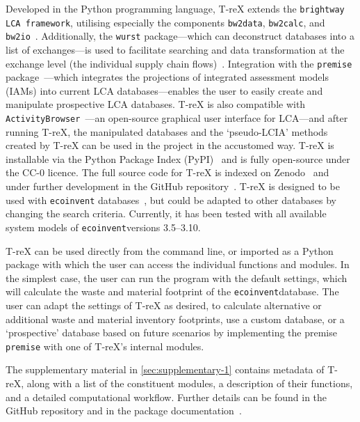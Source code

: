 \documentclass[a4paper,fleqn]{cas-dc}
\begin{document}
	Developed in the Python programming language, T-reX extends the \texttt{brightway LCA framework}, utilising especially the components
	\texttt{bw2data}, \texttt{bw2calc}, and
	\texttt{bw2io}~\citep{mutel2017brightway}. Additionally, the \texttt{wurst}
	package---which can deconstruct databases into a list of exchanges---is used to
	facilitate searching and data transformation at the exchange level (the
	individual supply chain flows)~\citep{mutel2017wurst}. Integration with the
	\texttt{premise} package~\citep{sacchi2022premise}---which integrates the
	projections of integrated assessment models (IAMs) into current LCA
	databases---enables the user to easily create and manipulate prospective LCA
	databases. T-reX is also compatible with
	\texttt{ActivityBrowser}~\citep{steubing2020activitybrowser}---an open-source
	graphical user interface for LCA---and after running T-reX, the manipulated
	databases and the `pseudo-LCIA' methods created by T-reX can be used in the
	project in the accustomed way. T-reX is installable via the Python Package
	Index (PyPI)~\citep{mcdowall2023T-reXpipy} and is fully open-source under the
	CC-0 licence. The full source code for T-reX is indexed on
	Zenodo~\citep{mcdowall2023T-reXzenodo} and under further development in the
	GitHub repository~\citep{mcdowall2024T-reXgithub}. T-reX is designed to be used
	with \texttt{ecoinvent} databases~\citep{ecoinvent2016version3}, but could be
	adapted to other databases by changing the search criteria. Currently, it has
	been tested with all available system models of \texttt{ecoinvent}versions
	3.5--3.10.
	
	T-reX can be used directly from the command line, or imported as a Python
	package with which the user can access the individual functions and modules. In
	the simplest case, the user can run the program with the default settings,
	which will calculate the waste and material footprint of the
	\texttt{ecoinvent}database. The user can adapt the settings of T-reX as
	desired, to calculate alternative or additional waste and material inventory
	footprints, use a custom database, or a `prospective' database based on future
	scenarios by implementing the premise \texttt{premise} with one of T-reX's
	internal modules.
	
	The supplementary material in \autoref{sec:supplementary-1} contains metadata of
	T-reX, along with a list of the constituent modules, a description of their
	functions, and a detailed computational workflow. Further details can be found
	in the GitHub repository and in the package documentation~\citep{mcdowall2024T-reXgithub, mcdowall2023T-reXdocs}.
	
\end{document}
